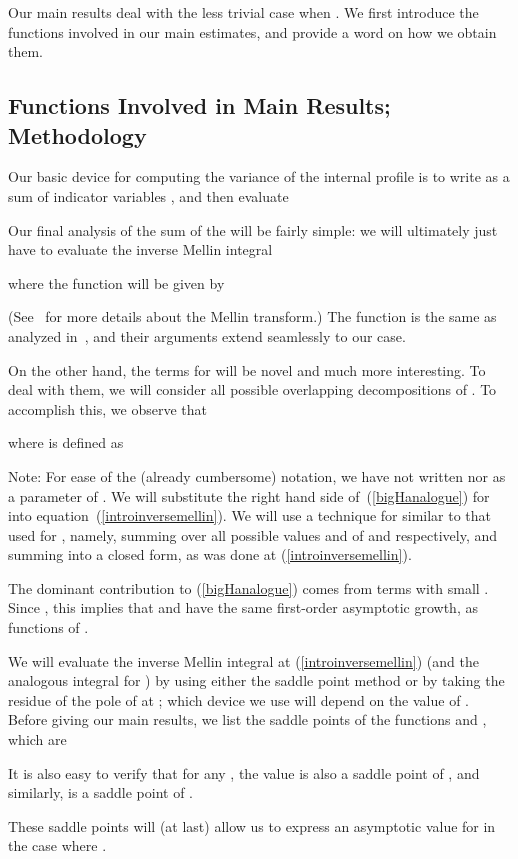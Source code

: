 \documentclass[proceedings]{aofa}
\begin{document}
Our main results deal with the less trivial case when . We first introduce the functions involved in our main estimates, and provide a word on how we obtain them. 

\subsection{Functions Involved in Main Results; Methodology}\label{subsec:intro}
Our basic device for computing the variance of the internal profile is to write  as a sum of indicator variables , and then evaluate


Our final analysis of the sum of the  will be fairly simple: we will ultimately just have to evaluate the inverse Mellin integral

where the function  will be given by

(See~\cite{PF120} for more details about the Mellin transform.)
The function  is the same as analyzed in~\cite{Park:2009}, and their arguments extend seamlessly to our case. 

On the other hand, the terms  for   will be
novel and much more interesting. To deal with them, we will consider
all possible overlapping decompositions  of
.  To accomplish this, we observe that 

where  is defined as

Note: For ease of the (already cumbersome) notation, we have not written
 nor  as a parameter of .
We will substitute the right hand side of~(\ref{bigHanalogue}) for 
 into equation~(\ref{introinversemellin}).
We will use a technique for  similar to that used for , namely, summing over all
possible values  and  of 
and  respectively, and summing  into a closed form, as
was done at (\ref{introinversemellin}).

The dominant contribution to (\ref{bigHanalogue}) comes from terms
with small . Since , this
implies that  and  have
the same first-order asymptotic growth, as functions of .

We will evaluate the inverse Mellin integral at
(\ref{introinversemellin}) (and the analogous integral for ) by using either the saddle point method or by taking the residue of the pole of  at ; which device we use will depend on the value of . Before giving our main results, we list the saddle points of the functions  and , which are

It is also easy to verify that for any , the value
 is also a saddle point of , and
similarly,  is a saddle point of .

These saddle points will (at last) allow us to express an asymptotic value for  in the case where .
\end{document}
